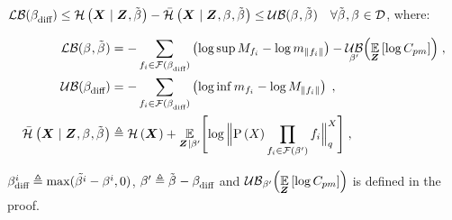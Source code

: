 \begin{corollaryE}
	\label{thm:bounds_elim}
	$\operatorname*{\mathcal{LB}}(\beta_{\textup{diff}}^{})\leq\mathcal{H}\left({\boldsymbol X_{}}\mid{\ensuremath{\boldsymbol Z_{}},\tilde{\ensuremath{\beta_{}^{}}}}\right)-\bar{\mathcal{H}}_{}\left({\boldsymbol X_{}}\mid{\ensuremath{\boldsymbol Z_{}},\ensuremath{\beta_{}^{}},\tilde{\ensuremath{\beta_{}^{}}}}\right)\leq\operatorname*{\mathcal{UB}}(\beta_{}^{},\tilde{\beta_{}^{}})\quad\forall\tilde{\beta_{}^{}},\beta_{}^{}\in\mathcal{D}$, where:
	\begin{small}
		\begin{subequations}
			\begin{align}
				\operatorname*{\mathcal{LB}}(\beta_{}^{},\tilde{\beta_{}^{}}) & =-\sum_{f_i\in\mathcal{F}(\beta_{\textup{diff}}^{})}\left(\log\sup M_{f_i}-\log m_{\lVert f_i\rVert}\right)-\operatorname*{\mathcal{UB}}_{\beta_{}^{\prime}}\Bigl(\operatorname*{\mathbb{E}}\limits_{\boldsymbol Z_{}}\left[{\log C_{pm}}\right]\Bigr)\;,\\
				\operatorname*{\mathcal{UB}}(\beta_{\textup{diff}}^{}) & =-\sum_{f_i\in\mathcal{F}(\beta_{\textup{diff}}^{})}\left(\log\inf m_{f_i}-\log M_{\lVert f_i\rVert}\right)\;,\\
				\bar{\mathcal{H}}_{}\left({\boldsymbol X_{}}\mid{\ensuremath{\boldsymbol Z_{}},\ensuremath{\beta_{}^{}},\tilde{\ensuremath{\beta_{}^{}}}}\right)&\triangleq\mathcal{H}\left({\boldsymbol X_{}}\right) +\operatorname*{\mathbb{E}}_{\boldsymbol Z_{}{}\mid\beta_{}^{\prime}}\Biggl[{\log\Big\lVert{\ensuremath{\mathrm{P}\left({X_{}}\right)}\prod_{f_i\in\mathcal{F}(\ensuremath{\beta_{}^{\prime}})}f_i}\Big\rVert_{q}^{X_{}}}\Biggr]\;,
			\end{align}
		\end{subequations}
	\end{small}
	$\beta_{\textup{diff}}^{i}\triangleq\max(\tilde{\beta_{}^{i}}-\beta_{}^{i},0)$, $\beta_{}^{\prime}\triangleq\tilde{\beta_{}^{}}-\beta_{\textup{diff}}^{}$ and	$\operatorname*{\mathcal{UB}}_{\beta_{}^{\prime}}\Bigl(\operatorname*{\mathbb{E}}\limits_{\boldsymbol Z_{}}\left[{\log C_{pm}}\right]\Bigr)$ is defined in the proof.
\end{corollaryE}
